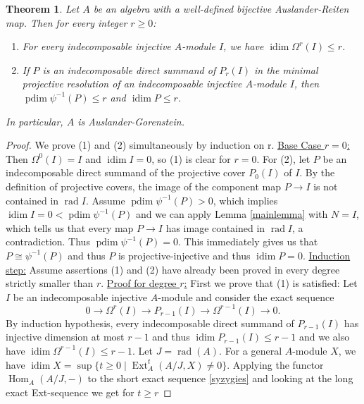 \documentclass[a4paper]{amsart}
\newtheorem{theorem}{Theorem}[section]
\theoremstyle{definition}
\theoremstyle{remark}
\numberwithin{equation}{section}
\newcommand{\Ext}{\operatorname{Ext}}
\newcommand{\pdim}{\operatorname{pdim}}
\newcommand{\idim}{\operatorname{idim}}
\newcommand{\Hom}{\operatorname{Hom}}
\newcommand{\rad}{\operatorname{\mathrm{rad}}}
\begin{document}
\begin{theorem}
Let $A$ be an algebra with a well-defined bijective Auslander-Reiten map.
Then for every integer $r \geq 0$:
\begin{enumerate}
    \item For every indecomposable injective $A$-module $I$, we have $\idim \Omega^r(I) \leq r$.
    \item If $P$ is an indecomposable direct summand of $P_r(I)$ in the minimal projective resolution of an indecomposable injective $A$-module $I$, then $\pdim \psi^{-1}(P) \leq r$ and $\idim P \leq r$.
\end{enumerate}
In particular, $A$ is Auslander-Gorenstein.
\end{theorem}
\begin{proof}
We prove (1) and (2) simultaneously by induction on r. \newline
\underline{Base Case $r=0$:} Then $\Omega^0(I)=I$ and $\idim I=0$, so (1) is clear for $r=0$. For (2), let $P$ be an indecomposable direct summand of the projective cover $P_0(I)$ of $I$. 
By the definition of projective covers, the image of the component map $P \rightarrow I$ is not contained in $\rad I$.
Assume $\pdim \psi^{-1}(P)>0$, which implies $\idim I =0 < \pdim \psi^{-1}(P)$ and we can apply Lemma \ref{mainlemma} with $N=I$, which tells us that every map $P \rightarrow I$ has image contained in $\rad I$, a contradiction. Thus $\pdim \psi^{-1}(P)=0$. This immediately gives us that $P \cong \psi^{-1}(P)$ and thus $P$ is projective-injective and thus $\idim P=0$. \newline
\underline{Induction step:}
Assume assertions (1) and (2) have already been proved in every degree strictly smaller than $r$. \newline
\underline{Proof for degree $r$:}
First we prove that (1) is satisfied: Let $I$ be an indecomposable injective $A$-module and consider
the exact sequence 
\begin{equation}\label{syzygies}
0 \longrightarrow \Omega^r(I) \longrightarrow P_{r-1}(I)
\longrightarrow \Omega^{r-1}(I) \longrightarrow 0.
\end{equation}
By induction hypothesis, every indecomposable direct summand of $P_{r-1}(I)$ has injective dimension at most $r-1$ and thus $\idim P_{r-1}(I) \leq r-1$ and we also have $\idim \Omega^{r-1}(I) \leq r-1$.
Let $J = \rad(A)$.
For a general $A$-module $X$, we have $\idim X= \sup \{ t \geq 0 \mid \Ext_A^t(A/J,X) \neq 0 \}$.
Applying the functor $\Hom_A(A/J,-)$ to the short exact sequence \ref{syzygies} and looking at the long exact Ext-sequence we get for $t \geq r$

\end{proof}
\end{document}
